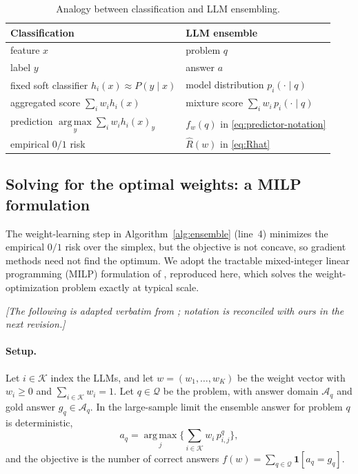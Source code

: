 \documentclass{article} %
\providecommand{\argmax}{\mathop{\mathrm{arg\,max}}\limits}
\providecommand{\eRisk}{\widehat{R}}
\begin{document}
\begin{table}[t]
\centering
\caption{Analogy between classification and LLM ensembling.}
\label{tab:dictionary}
\begin{tabular}{ll}
\toprule
Classification & LLM ensemble \\
\midrule
feature $x$ & problem $q$ \\
label $y$ & answer $a$ \\
fixed soft classifier $h_i(x)\approx P(y\mid x)$ & model distribution $p_i(\cdot\mid q)$ \\
aggregated score $\sum_i w_i h_i(x)$ & mixture score $\sum_i w_i\,p_i(\cdot\mid q)$ \\
prediction $\argmax_y \sum_i w_i h_i(x)_y$ & $f_w(q)$ in \eqref{eq:predictor-notation} \\
empirical $0/1$ risk & $\eRisk(w)$ in \eqref{eq:Rhat} \\
\bottomrule
\end{tabular}
\end{table}

\subsection{Solving for the optimal weights: a MILP formulation}
\label{sec:method-milp}

The weight-learning step in Algorithm~\ref{alg:ensemble} (line~4) minimizes the
empirical $0/1$ risk over the simplex, but the objective is not concave, so
gradient methods need not find the optimum. We adopt the tractable
mixed-integer linear programming (MILP) formulation of \citet{komiyama2026best},
reproduced here, which solves the weight-optimization problem exactly at typical
scale.

\medskip
\noindent\emph{[The following is adapted verbatim from
\citet{komiyama2026best}; notation is reconciled with ours in the next
revision.]}

\paragraph{Setup.} Let $i \in \mathcal{K}$ index the LLMs, and let
$w = (w_1,\dots,w_K)$ be the weight vector with $w_i \ge 0$ and
$\sum_{i \in \mathcal{K}} w_i = 1$. Let $q \in \mathcal{Q}$ be the problem, with
answer domain $\mathcal{A}_q$ and gold answer $g_q \in \mathcal{A}_q$. In the
large-sample limit the ensemble answer for problem $q$ is deterministic,
\[
a_q = \argmax_j \Big\{ \sum_{i \in \mathcal{K}} w_i\, p_{i,j}^q \Big\},
\]
and the objective is the number of correct answers
$f(w) = \sum_{q \in \mathcal{Q}} \mathbf{1}[a_q = g_q]$.
\end{document}
